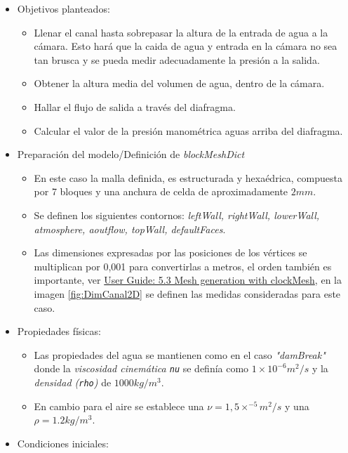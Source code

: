 \begin{itemize}
\item
  Objetivos planteados:

  \begin{itemize}
  \item
    Llenar el canal hasta sobrepasar la altura de la entrada de agua a
    la cámara. Esto hará que la caida de agua y entrada en la cámara no
    sea tan brusca y se pueda medir adecuadamente la presión a la
    salida.
  \item
    Obtener la altura media del volumen de agua, dentro de la cámara.
  \item
    Hallar el flujo de salida a través del diafragma.
  \item
    Calcular el valor de la presión manométrica aguas arriba del
    diafragma.
  \end{itemize}
\item
  Preparación del modelo/Definición de \emph{blockMeshDict}

  \begin{itemize}
  \item
    En este caso la malla definida, es estructurada y hexaédrica,
    compuesta por 7 bloques y una anchura de celda de aproximadamente
    \(2 mm\).
  \item
    Se definen los siguientes contornos: \emph{leftWall, rightWall,
    lowerWall, atmosphere, aoutflow, topWall, defaultFaces}.
  \item
    Las dimensiones expresadas por las posiciones de los vértices se
    multiplican por 0,001 para convertirlas a metros, el orden también
    es importante, ver
    \href{https://cfd.direct/openfoam/user-guide/blockmesh/}{User Guide:
    5.3 Mesh generation with clockMesh}, en la imagen \autoref{fig:DimCanal2D} se definen las
    medidas consideradas para este caso.

  \end{itemize}
\item
  Propiedades físicas:

  \begin{itemize}
  \item
    Las propiedades del agua se mantienen como en el caso
    \emph{"damBreak"} donde la \emph{viscosidad cinemática \texttt{nu}}
    se definía como \(1\times10^{-6} m^2/s\) y la \emph{densidad
    (\texttt{rho})} de \(1000 kg/m^3\).
  \item
    En cambio para el aire se establece una
    \(\nu=1,5 \times ^{-5} m^2/s\) y una \(\rho=1.2kg/m^3\).
  \end{itemize}
\item
  Condiciones iniciales:


\end{itemize}
